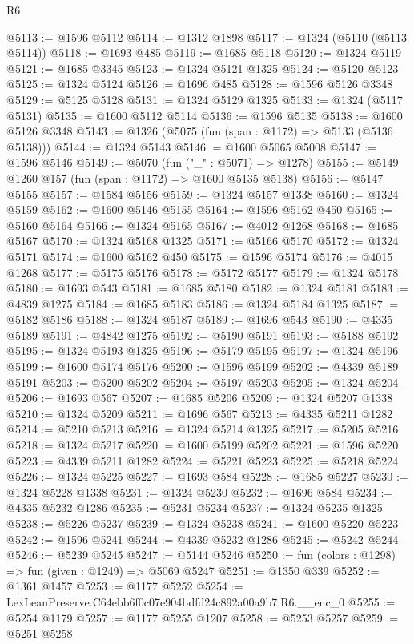 \begin{lexlean}{R6}
\begin{coremodule}
@5113 := @1596 @5112
@5114 := @1312 @1898
@5117 := @1324 (@5110 (@5113 @5114))
@5118 := @1693 @485
@5119 := @1685 @5118
@5120 := @1324 @5119
@5121 := @1685 @3345
@5123 := @1324 @5121 @1325
@5124 := @5120 @5123
@5125 := @1324 @5124
@5126 := @1696 @485
@5128 := @1596 @5126 @3348
@5129 := @5125 @5128
@5131 := @1324 @5129 @1325
@5133 := @1324 (@5117 @5131)
@5135 := @1600 @5112 @5114
@5136 := @1596 @5135
@5138 := @1600 @5126 @3348
@5143 := @1326 (@5075 (fun (span : @1172) => @5133 (@5136 @5138)))
@5144 := @1324 @5143
@5146 := @1600 @5065 @5008
@5147 := @1596 @5146
@5149 := @5070 (fun ("_" : @5071) => @1278)
@5155 := @5149 @1260 @157 (fun (span : @1172) => @1600 @5135 @5138)
@5156 := @5147 @5155
@5157 := @1584 @5156
@5159 := @1324 @5157 @1338
@5160 := @1324 @5159
@5162 := @1600 @5146 @5155
@5164 := @1596 @5162 @450
@5165 := @5160 @5164
@5166 := @1324 @5165
@5167 := @4012 @1268
@5168 := @1685 @5167
@5170 := @1324 @5168 @1325
@5171 := @5166 @5170
@5172 := @1324 @5171
@5174 := @1600 @5162 @450
@5175 := @1596 @5174
@5176 := @4015 @1268
@5177 := @5175 @5176
@5178 := @5172 @5177
@5179 := @1324 @5178
@5180 := @1693 @543
@5181 := @1685 @5180
@5182 := @1324 @5181
@5183 := @4839 @1275
@5184 := @1685 @5183
@5186 := @1324 @5184 @1325
@5187 := @5182 @5186
@5188 := @1324 @5187
@5189 := @1696 @543
@5190 := @4335 @5189
@5191 := @4842 @1275
@5192 := @5190 @5191
@5193 := @5188 @5192
@5195 := @1324 @5193 @1325
@5196 := @5179 @5195
@5197 := @1324 @5196
@5199 := @1600 @5174 @5176
@5200 := @1596 @5199
@5202 := @4339 @5189 @5191
@5203 := @5200 @5202
@5204 := @5197 @5203
@5205 := @1324 @5204
@5206 := @1693 @567
@5207 := @1685 @5206
@5209 := @1324 @5207 @1338
@5210 := @1324 @5209
@5211 := @1696 @567
@5213 := @4335 @5211 @1282
@5214 := @5210 @5213
@5216 := @1324 @5214 @1325
@5217 := @5205 @5216
@5218 := @1324 @5217
@5220 := @1600 @5199 @5202
@5221 := @1596 @5220
@5223 := @4339 @5211 @1282
@5224 := @5221 @5223
@5225 := @5218 @5224
@5226 := @1324 @5225
@5227 := @1693 @584
@5228 := @1685 @5227
@5230 := @1324 @5228 @1338
@5231 := @1324 @5230
@5232 := @1696 @584
@5234 := @4335 @5232 @1286
@5235 := @5231 @5234
@5237 := @1324 @5235 @1325
@5238 := @5226 @5237
@5239 := @1324 @5238
@5241 := @1600 @5220 @5223
@5242 := @1596 @5241
@5244 := @4339 @5232 @1286
@5245 := @5242 @5244
@5246 := @5239 @5245
@5247 := @5144 @5246
@5250 := fun (colors : @1298) => fun (given : @1249) => @5069 @5247
@5251 := @1350 @339
@5252 := @1361 @1457
@5253 := @1177 @5252
@5254 := LexLeanPreserve.C64ebb6f0c07e904bdfd24c892a00a9b7.R6.__enc_0
@5255 := @5254 @1179
@5257 := @1177 @5255 @1207
@5258 := @5253 @5257
@5259 := @5251 @5258

\end{coremodule}
\end{lexlean}
